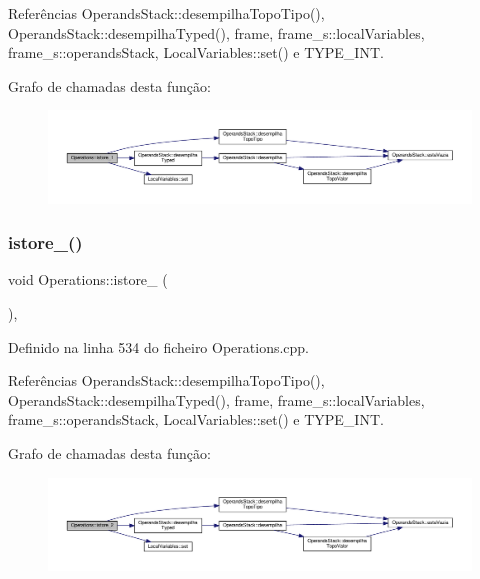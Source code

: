 Referências Operands\+Stack\+::desempilha\+Topo\+Tipo(), Operands\+Stack\+::desempilha\+Typed(), frame, frame\+\_\+s\+::local\+Variables, frame\+\_\+s\+::operands\+Stack, Local\+Variables\+::set() e T\+Y\+P\+E\+\_\+\+I\+NT.

Grafo de chamadas desta função\+:\nopagebreak
\begin{figure}[H]
\begin{center}
\leavevmode
\includegraphics[width=350pt]{classOperations_aeb89677195b16d5c595ec9faaddc2c76_cgraph}
\end{center}
\end{figure}
\mbox{\label{classOperations_a0fbc901b4c88aef8455b30d9b2063447}} 
\subsubsection{\texorpdfstring{istore\+\_()}{istore\_2()}}
{\footnotesize\ttfamily void Operations\+::istore\+\_ (\begin{DoxyParamCaption}{ }\end{DoxyParamCaption})\hspace{0.3cm}{\ttfamily [static]}, {\ttfamily [private]}}



Definido na linha 534 do ficheiro Operations.\+cpp.



Referências Operands\+Stack\+::desempilha\+Topo\+Tipo(), Operands\+Stack\+::desempilha\+Typed(), frame, frame\+\_\+s\+::local\+Variables, frame\+\_\+s\+::operands\+Stack, Local\+Variables\+::set() e T\+Y\+P\+E\+\_\+\+I\+NT.

Grafo de chamadas desta função\+:\nopagebreak
\begin{figure}[H]
\begin{center}
\leavevmode
\includegraphics[width=350pt]{classOperations_a0fbc901b4c88aef8455b30d9b2063447_cgraph}
\end{center}
\end{figure}
\mbox{\label{classOperations_a3ff20f0475eaaa28501ea330074f5cb7}} 
